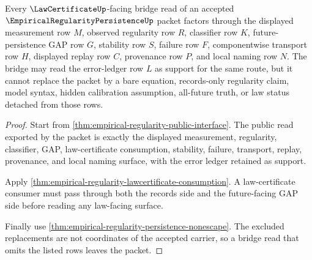 \begin{theorem}
\label{thm:empirical-regularity-persistence-bridge-route}
Every $\LawCertificateUp$-facing bridge read of an accepted $\EmpiricalRegularityPersistenceUp$ packet factors through the displayed measurement row $M$, observed regularity row $R$, classifier row $K$, future-persistence GAP row $G$, stability row $S$, failure row $F$, componentwise transport row $H$, displayed replay row $C$, provenance row $P$, and local naming row $N$. The bridge may read the error-ledger row $L$ as support for the same route, but it cannot replace the packet by a bare equation, records-only regularity claim, model syntax, hidden calibration assumption, all-future truth, or law status detached from those rows.
\end{theorem}
\begin{proof}
Start from \autoref{thm:empirical-regularity-public-interface}. The public read exported by the packet is exactly the displayed measurement, regularity, classifier, GAP, law-certificate consumption, stability, failure, transport, replay, provenance, and local naming surface, with the error ledger retained as support.

Apply \autoref{thm:empirical-regularity-lawcertificate-consumption}. A law-certificate consumer must pass through both the records side and the future-facing GAP side before reading any law-facing surface.

Finally use \autoref{thm:empirical-regularity-persistence-nonescape}. The excluded replacements are not coordinates of the accepted carrier, so a bridge read that omits the listed rows leaves the packet.
\end{proof}


